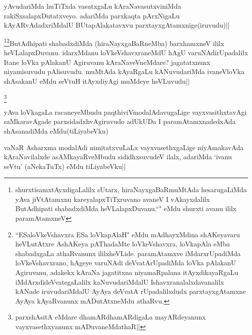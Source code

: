 
\begin{artha}
yAvudariMda huTiTxda vasutxgaLu kAraNavasutxviniMda rakiSxsalapxDutatxveyo. adariMda parxkaqta pArxNigaLu kAyARvAdadxriMdalU BUtapAlakatavxvu parxtayxgAtamxnige(iruvudu)||
\end{artha}


\begin{artha}
\footnote{shurxtisamxtAyxdigaLalilx sUtarx, hiraNayxgaBaRmuMtAda hesarugaLiMda yAva jiVtAtamxnu kareyalapxTiTxruvano avaneV I vAkayxdalilx ButAdhipati shabadxdiMda heVLalapxDuvanu.``\stext" eMdu shurxti avanu ililx paramAtamxneV}\footnote{``ESaloVkeVshavxra ESa loVkapAlaH" eMdu mAdhayxMdina shAKeyavaru heVLutAtxre AshAKeya pAThadaMte loVkeVshavxra, loVkapAla eMba shabadxgaLa athaRvanunx ililxheVLide. paramAtamxve iMdarxrUpadiMda loVkeVshavxrano, hAgeye varuNAdi deVvatArUpadiMda loVka pAlakanU Agiruvanu, adakekx kAraNa jagatitxna niyamaRpalana itAyxdikayaRgaLu iMdArxdideVvategaLalilx kaNuvudariMdalU Ishavxranalalxdavanalilx kANade iruvudariMdalU AyAya deVvatA rUpadalilxdudx parxtayxgAtamxne AyAya kAyaRvanunx mADutAtxneMdu athaRvu.}ButAdhipati shabadxdiMda (hiraNayxgaBaRneMba) barxhamxneV ililx heVLalapxDuvanu. idarxMdanu loVkeVshavxraneMdU hAgU varuNAdirUpadalilx Itane loVka pAlakanU Agiruvanu kAraNaveVneMdare? jagatatxnunx niyamisuvudu pAlisuvudu. muMtAda kAyaRgaLu kANuvudariMda ivaneVloVka shAsakanU eMdu seVtuH itAyxdiyAgi muMdeye heVLuvudu||
\end{artha}

\begin{artha}
\footnote{parxshAsitA eMdare dhamARdhamARdigaLa mayARdeyanunx vayxvasethxyanunx mADuvaneMdathaR||}
\end{artha}


\begin{artha}
yAva loVkagaLa racaneyeMbudu paqthiviVmodalAdavugaLige vayxvasithxtavAgi saMkaravAgade parxsidadxhvAgiruvudo adUkUDa I paramAtamxnadedxAda shAsanadiMda eMdu(tiLiyabeVku)
\end{artha}


\begin{artha}
vaNaR Asharxma modalAdi nimitatxvuLaLx vayxvasethxgaLige niyAmakavAda kAraNavilalxde asAMkayaRveMbudu sididhxsuvudeV ilalx, adariMda `ivanu seVtu' (aNekaTuTx) eMdu tiLiyabeVku||
\end{artha}

